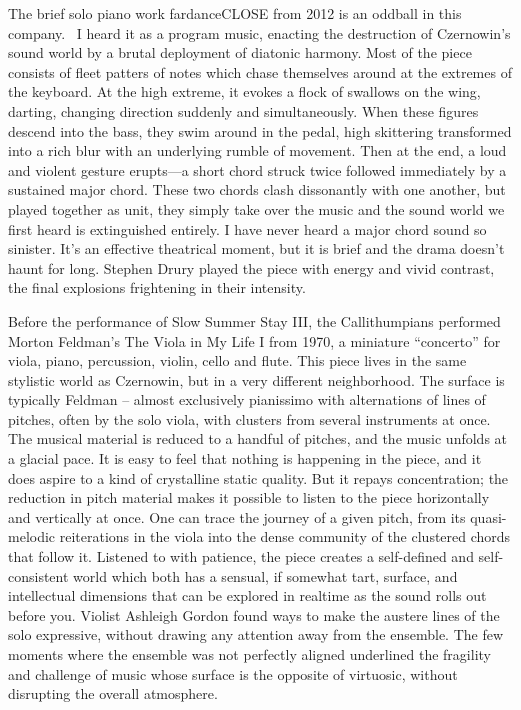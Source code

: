 The brief solo piano work fardanceCLOSE from 2012 is an oddball in this company.  I heard it as a program music, enacting the destruction of Czernowin’s sound world by a brutal deployment of diatonic harmony. Most of the piece consists of fleet patters of notes which chase themselves around at the extremes of the keyboard. At the high extreme, it evokes a flock of swallows on the wing, darting, changing direction suddenly and simultaneously. When these figures descend into the bass, they swim around in the pedal, high skittering transformed into a rich blur with an underlying rumble of movement. Then at the end, a loud and violent gesture erupts—a short chord struck twice followed immediately by a sustained major chord. These two chords clash dissonantly with one another, but played together as unit, they simply take over the music and the sound world we first heard is extinguished entirely. I have never heard a major chord sound so sinister. It’s an effective theatrical moment, but it is brief and the drama doesn’t haunt for long. Stephen Drury played the piece with energy and vivid contrast, the final explosions frightening in their intensity.

Before the performance of Slow Summer Stay III, the Callithumpians performed Morton Feldman’s The Viola in My Life I from 1970, a miniature “concerto” for viola, piano, percussion, violin, cello and flute. This piece lives in the same stylistic world as Czernowin, but in a very different neighborhood. The surface is typically Feldman – almost exclusively pianissimo with alternations of lines of pitches, often by the solo viola, with clusters from several instruments at once.  The musical material is reduced to a handful of pitches, and the music unfolds at a glacial pace. It is easy to feel that nothing is happening in the piece, and it does aspire to a kind of crystalline static quality. But it repays concentration; the reduction in pitch material makes it possible to listen to the piece horizontally and vertically at once. One can trace the journey of a given pitch, from its quasi-melodic reiterations in the viola into the dense community of the clustered chords that follow it. Listened to with patience, the piece creates a self-defined and self-consistent world which both has a sensual, if somewhat tart, surface, and intellectual dimensions that can be explored in realtime as the sound rolls out before you. Violist Ashleigh Gordon found ways to make the austere lines of the solo expressive, without drawing any attention away from the ensemble. The few moments where the ensemble was not perfectly aligned underlined the fragility and challenge of music whose surface is the opposite of virtuosic, without disrupting the overall atmosphere.

